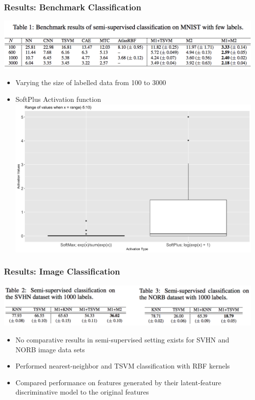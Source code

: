 \documentclass{beamer}
\begin{document}
\begin{frame}
  \frametitle{Results: Benchmark Classification}

  \includegraphics[scale=0.5]{table1}

  \begin{itemize}
  \item Varying the size of labelled data from 100 to 3000
  \item SoftPlus Activation function
    \includegraphics[scale=0.05]{activations}
    \end{itemize}
  
\end{frame}
\begin{frame}
  \frametitle{Results: Image Classification}

  \includegraphics[scale=0.5]{table2and3}

  \begin{itemize}
  \item No comparative results in semi-supervised setting exists for
    SVHN and NORB image data sets
  \item Performed nearest-neighbor and TSVM classification with RBF
    kernels
  \item Compared performance on features generated by their latent-feature
    discriminative model to the original features
    \end{itemize}

\end{frame}
\end{document}
